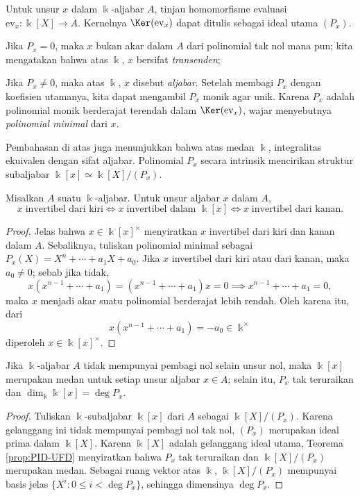 \begin{definition}\label{def:algebraic-element}
	Untuk unsur $x$ dalam $\Bbbk$-aljabar $A$, tinjau homomorfisme evaluasi $\text{ev}_x: \Bbbk[X] \to A$. Kernelnya $\Ker(\text{ev}_x)$ dapat ditulis sebagai ideal utama $(P_x)$.
	\begin{compactitem}
		\item Jika $P_x = 0$, maka $x$ bukan akar dalam $A$ dari polinomial tak nol mana pun; kita mengatakan bahwa atas $\Bbbk$, $x$ bersifat \emph{transenden};
		\item Jika $P_x \neq 0$, maka atas $\Bbbk$, $x$ disebut \emph{aljabar}. Setelah membagi $P_x$ dengan koefisien utamanya, kita dapat mengambil $P_x$ monik agar unik. Karena $P_x$ adalah polinomial monik berderajat terendah dalam $\Ker(\text{ev}_x)$, wajar menyebutnya \emph{polinomial minimal} dari $x$.  
	\end{compactitem}
\end{definition}
Pembahasan di atas juga menunjukkan bahwa atas medan $\Bbbk$, integralitas ekuivalen dengan sifat aljabar. Polinomial $P_x$ secara intrinsik mencirikan struktur subaljabar $\Bbbk[x] \simeq \Bbbk[X]/(P_x)$.

\begin{lemma}
	Misalkan $A$ suatu $\Bbbk$-aljabar. Untuk unsur aljabar $x$ dalam $A$,
	\[ x\; \text{invertibel dari kiri} \iff x\; \text{invertibel dalam $\Bbbk[x]$} \iff x\; \text{invertibel dari kanan}. \]
\end{lemma}
\begin{proof}
	Jelas bahwa $x \in \Bbbk[x]^\times$ menyiratkan $x$ invertibel dari kiri dan kanan dalam $A$. Sebaliknya, tuliskan polinomial minimal sebagai $P_x(X) = X^n + \cdots + a_1 X + a_0$. Jika $x$ invertibel dari kiri atau dari kanan, maka $a_0 \neq 0$; sebab jika tidak,
	\[ x(x^{n-1} + \cdots + a_1) = (x^{n-1} + \cdots + a_1)x = 0 \implies x^{n-1} + \cdots + a_1 = 0, \]
	maka $x$ menjadi akar suatu polinomial berderajat lebih rendah. Oleh karena itu, dari
	\[ x (x^{n-1} + \cdots + a_1) = -a_0 \in \Bbbk^\times \]
	diperoleh $x \in \Bbbk[x]^\times$.
\end{proof}

\begin{lemma}\label{prop:minimal-polynomial}
	Jika $\Bbbk$-aljabar $A$ tidak mempunyai pembagi nol selain unsur nol, maka $\Bbbk[x]$ merupakan medan untuk setiap unsur aljabar $x \in A$; selain itu, $P_x$ tak teruraikan dan $\dim_\Bbbk \Bbbk[x] = \deg P_x$.
\end{lemma}
\begin{proof}
	Tuliskan $\Bbbk$-subaljabar $\Bbbk[x]$ dari $A$ sebagai $\Bbbk[X]/(P_x)$. Karena gelanggang ini tidak mempunyai pembagi nol tak nol, $(P_x)$ merupakan ideal prima dalam $\Bbbk[X]$. Karena $\Bbbk[X]$ adalah gelanggang ideal utama, Teorema \ref{prop:PID-UFD} menyiratkan bahwa $P_x$ tak teruraikan dan $\Bbbk[X]/(P_x)$ merupakan medan. Sebagai ruang vektor atas $\Bbbk$, $\Bbbk[X]/(P_x)$ mempunyai basis jelas $\{X^i: 0 \leq i < \deg P_x \}$, sehingga dimensinya $\deg P_x$.
\end{proof}

